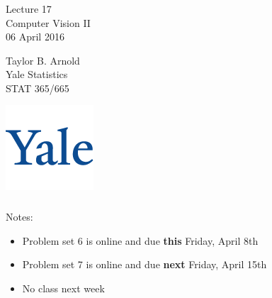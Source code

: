 \documentclass[xetex,mathserif,serif,aspectratio=169]{beamer}
\begin{document}
\begin{frame}[fragile] \frametitle{} \oldB \small

\vfill

{\fontsize{0.7cm}{0cm}\selectfont Lecture 17 \\\vspace{0.2cm}
Computer Vision II}\\\vspace{0.5cm}
06 April 2016

\vspace{2cm}

\begin{minipage}{0.6\textwidth}
Taylor B. Arnold \\
Yale Statistics \\
STAT 365/665
\end{minipage}
\hfill
\begin{minipage}{0.3\textwidth}\raggedleft
\includegraphics[scale=0.3]{../yale-logo.png}
\end{minipage}%

\end{frame}

\begin{frame}[fragile] \frametitle{} \oldB \small

Notes:
\begin{itemize}
\item Problem set 6 is online and due \textbf{this} Friday, April 8th
\item Problem set 7 is online and due \textbf{next} Friday, April 15th
\item No class next week
\end{itemize}

\end{frame}
\end{document}
